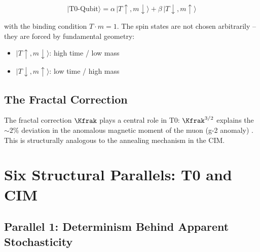 \begin{equation}
    |\text{T0-Qubit}\rangle = \alpha \, |T{\uparrow}, m{\downarrow}\rangle
    + \beta \, |T{\downarrow}, m{\uparrow}\rangle
    \label{eq:t0_qubit}
\end{equation}

with the binding condition $T \cdot m = 1$. The spin states are not chosen
arbitrarily -- they are forced by fundamental geometry:

\begin{itemize}
    \item $|T{\uparrow}, m{\downarrow}\rangle$: high time / low mass
    \item $|T{\downarrow}, m{\uparrow}\rangle$: low time / high mass
\end{itemize}

\subsection{The Fractal Correction}

The fractal correction $\Kfrak$ plays a central role in T0:
$\Kfrak^{3/2}$ explains the $\sim 2\%$ deviation in the anomalous magnetic
moment of the muon (g-2 anomaly) \cite{pascher_g2_2025}. This is structurally
analogous to the annealing mechanism in the CIM.

\clearpage

\section{Six Structural Parallels: T0 and CIM}
\label{sec:parallels}

\subsection{Parallel 1: Determinism Behind Apparent Stochasticity}

\begin{table}[h]
    \centering
    \caption{Parallel 1: Determinism}
    \label{tab:parallel1}
\end{table}

